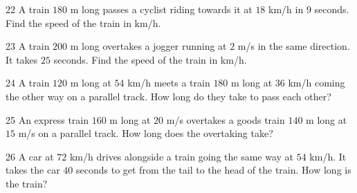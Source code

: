 \gap
\begin{probbox}{22}{\relax}
A train $180$ m long passes a cyclist riding towards it at $18$ km/h in $9$ seconds. Find the speed of the train in km/h.
\end{probbox}
\gap
\begin{probbox}{23}{\relax}
A train $200$ m long overtakes a jogger running at $2$ m/s in the same direction. It takes $25$ seconds. Find the speed of the train in km/h.
\end{probbox}
\gap
\begin{probbox}{24}{\relax}
A train $120$ m long at $54$ km/h meets a train $180$ m long at $36$ km/h coming the other way on a parallel track. How long do they take to pass each other?
\end{probbox}
\gap
\begin{probbox}{25}{\relax}
An express train $160$ m long at $20$ m/s overtakes a goods train $140$ m long at $15$ m/s on a parallel track. How long does the overtaking take?
\end{probbox}
\gap
\begin{probbox}{26}{\relax}
A car at $72$ km/h drives alongside a train going the same way at $54$ km/h. It takes the car $40$ seconds to get from the tail to the head of the train. How long is the train?
\end{probbox}
